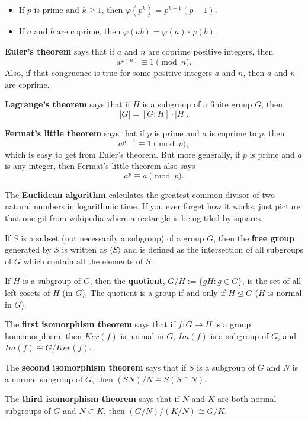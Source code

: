 \documentclass[12pt]{article}
\begin{document}
\begin{itemize}
    \item If $p$ is prime and $k \geq 1$, then $\varphi(p^k) = p^{k-1}(p-1)$.
    \item If $a$ and $b$ are coprime, then $\varphi(ab) = \varphi(a) \cdot \varphi(b)$.
\end{itemize}
\bigskip
\par
\textbf{Euler's theorem} says that if $a$ and $n$ are coprime positive integers, then
\[ a^{\varphi(n)} \equiv 1 \pmod{n}. \]
Also, if that congruence is true for some positive integers $a$ and $n$, then $a$ and $n$ are coprime.
\bigskip
\par
\textbf{Lagrange's theorem} says that if $H$ is a subgroup of a finite group $G$, then
\[ |G| = [G:H] \cdot |H|. \]
\bigskip
\par
\textbf{Fermat's little theorem} says that if $p$ is prime and $a$ is coprime to $p$, then
\[ a^{p-1} \equiv 1 \pmod{p}, \]
which is easy to get from Euler's theorem. But more generally, if $p$ is prime and $a$ is any integer, then Fermat's little theorem also says
\[ a^p \equiv a \pmod{p}. \]
\bigskip
\par
The \textbf{Euclidean algorithm} calculates the greatest common divisor of two natural numbers in logarithmic time. If you ever forget how it works, just picture that one gif from wikipedia where a rectangle is being tiled by squares.
\bigskip
\par
If $S$ is a subset (not necessarily a subgroup) of a group $G$, then the \textbf{free group} generated by $S$ is written as $\langle S \rangle$ and is defined as the intersection of all subgroups of $G$ which contain all the elements of $S$.
\bigskip
\par
If $H$ is a subgroup of $G$, then the \textbf{quotient}, $G/H:=\{gH:g\in G\}$, is the set of all left cosets of $H$ (in $G$). The quotient is a group if and only if $H \trianglelefteq G$ ($H$ is normal in $G$).
\bigskip
\par
The \textbf{first isomorphism theorem} says that if $f: G \rightarrow H$ is a group homomorphism, then $Ker(f)$ is normal in $G$, $Im(f)$ is a subgroup of $G$, and $Im(f) \cong G / Ker(f)$.
\bigskip
\par
The \textbf{second isomorphism theorem} says that if $S$ is a subgroup of $G$ and $N$ is a normal subgroup of $G$, then $(SN)/N \cong S(S \cap N)$.
\bigskip
\par
The \textbf{third isomorphism theorem} says that if $N$ and $K$ are both normal subgroups of $G$ and $N \subset K$, then $(G/N)/(K/N) \cong G/K$.
\end{document}
